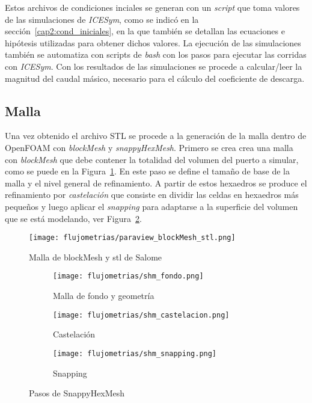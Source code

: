 Estos archivos de condiciones inciales se generan con un \emph{script} que toma
valores de las simulaciones de \emph{ICESym}, como se indicó en la
sección~\ref{cap2:cond_iniciales}, en la que también se detallan las ecuaciones
e hipótesis utilizadas para obtener dichos valores.
%
La ejecución de las simulaciones también se automatiza con scripts de
\emph{bash} con los pasos para ejecutar las corridas con \emph{ICESym}.
%
Con los resultados de las simulaciones se procede a calcular/leer la magnitud
del caudal másico, necesario para el cálculo del coeficiente de descarga.


\subsection{Malla}\label{sec:cap3_of_malla}
%
Una vez obtenido el archivo STL se procede a la generación de la malla dentro de
OpenFOAM con \emph{blockMesh} y \emph{snappyHexMesh}.
%
Primero se crea crea una malla con \emph{blockMesh} que  debe contener la
totalidad del volumen del puerto a simular, como se puede en la
Figura~\ref{fig:paraview_blockMesh_stl}.
%
En este paso se define el tamaño de base de la malla y el nivel general de
refinamiento.
%
A partir de estos hexaedros se produce el refinamiento por \emph{castelación}
que consiste en dividir las celdas en hexaedros más pequeños y luego aplicar el
\emph{snapping} para adaptarse a la superficie del volumen que se está
modelando, ver Figura~\ref{fig:openfoam_shm_pasos}.
%

\begin{figure}[h!]
    \centering
    \texttt{[image: flujometrias/paraview\_blockMesh\_stl.png]}
    \caption{Malla de blockMesh y stl de Salome}\label{fig:paraview_blockMesh_stl}
\end{figure}

\begin{figure}[h!]
    \centering
    \begin{subfigure}[t]{0.5\textwidth}
        \centering
        \texttt{[image: flujometrias/shm\_fondo.png]}
        \caption{Malla de fondo y geometría}
    \end{subfigure}%
    \begin{subfigure}[t]{0.5\textwidth}
        \centering
        \texttt{[image: flujometrias/shm\_castelacion.png]}
        \caption{Castelación}
    \end{subfigure}
    \begin{subfigure}[t]{0.5\textwidth}
        \centering
        \texttt{[image: flujometrias/shm\_snapping.png]}
        \caption{Snapping}
    \end{subfigure}
    \caption{Pasos de SnappyHexMesh\parencite{shm_steps}}\label{fig:openfoam_shm_pasos}
\end{figure}

